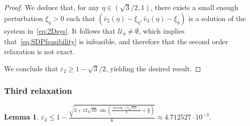 \documentclass[a4paper,12pt]{article}
\newtheorem{lemma}{Lemma}
\begin{document}
\begin{proof}
{We deduce that, for any $\eta \in (\sqrt{3}/2, 1)$,
there exists a small enough perturbation
$\xi_\eta > 0$
such that $(\bar{v}_2(\eta) - \xi_\eta, \bar{v}_3(\eta) - \xi_\eta)$
is a solution of the system in~\eqref{eq:2Dsys}.
It follows that $\mathcal{U}_\eta \neq \emptyset$,
which implies that~\eqref{eq:SDPfeasibility} is infeasible,
and therefore that the second order relaxation is not exact.

We conclude that $\varepsilon_2 \geq 1 - \sqrt{3} / 2$, yielding the desired result.}
\end{proof}

\subsubsection{Third relaxation}


\begin{lemma}
\label{lemma:eps3}
$\varepsilon_3 \leq 1-\frac{\sqrt{3+12 \sqrt{10}\, \sin \! \left(\frac{\arctan \left(3 \sqrt{111}\right)}{3}+\frac{\pi}{6}\right)}}{6} \approx 4.712527\cdot 10^{-3}.$
\end{lemma}
\end{document}
